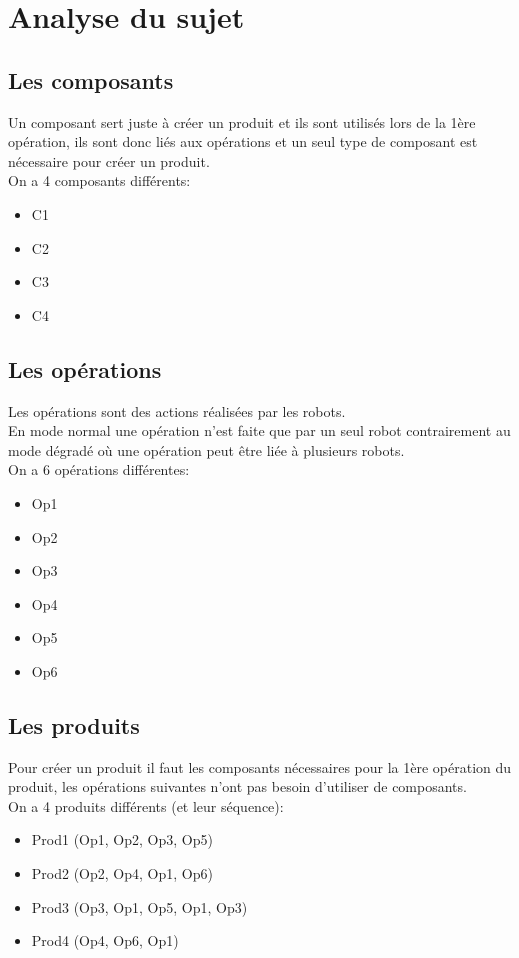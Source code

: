 \documentclass{report}
\begin{document}
\section{Analyse du sujet}
\subsection{Les composants}
Un composant sert juste à créer un produit et ils sont utilisés lors de la 1ère opération, ils sont donc liés aux opérations et un seul type de composant est nécessaire pour créer un produit.\\
On a 4 composants différents:
\begin{itemize}
\item C1
\item C2
\item C3
\item C4
\end{itemize}
\subsection{Les opérations}
Les opérations sont des actions réalisées par les robots.\\
En mode normal une opération n'est faite que par un seul robot contrairement au mode dégradé où une opération peut être liée à plusieurs robots.\\
On a 6 opérations différentes:
\begin{itemize}
\item Op1
\item Op2
\item Op3
\item Op4
\item Op5
\item Op6
\end{itemize}
\subsection{Les produits}
Pour créer un produit il faut les composants nécessaires pour la 1ère opération du produit, les opérations suivantes n'ont pas besoin d'utiliser de composants.\\
On a 4 produits différents (et leur séquence):
\begin{itemize}
\item Prod1 (Op1, Op2, Op3, Op5)
\item Prod2 (Op2, Op4, Op1, Op6)
\item Prod3 (Op3, Op1, Op5, Op1, Op3)
\item Prod4 (Op4, Op6, Op1)
\end{itemize}
\end{document}

